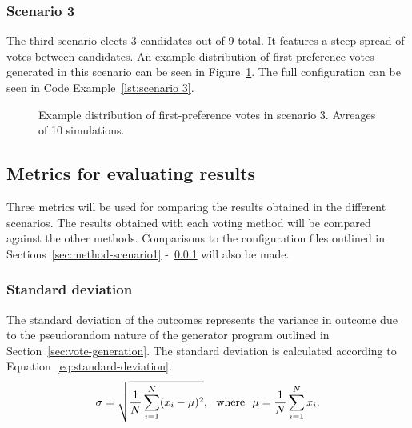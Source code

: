 \documentclass[12pt]{article}
\begin{document}
\subsubsection{Scenario 3}
\label{sec:method-scenario3}
The third scenario elects 3 candidates out of 9 total. It features a steep spread of votes between candidates. An example distribution of first-preference votes generated in this scenario can be seen in Figure~\ref{fig:example of scenario 3}. The full configuration can be seen in Code Example~\ref{lst:scenario 3}.
\begin{figure}[H]
	\centering
	\caption{Example distribution of first-preference votes in scenario 3. Avreages of 10 simulations.}
\label{fig:example of scenario 3}
\end{figure}
\subsection{Metrics for evaluating results}
Three metrics will be used for comparing the results obtained in the different scenarios. The results obtained with each voting method will be compared against the other methods. Comparisons to the configuration files outlined in Sections~\ref{sec:method-scenario1} -~\ref{sec:method-scenario3} will also be made.
\subsubsection{Standard deviation}
The standard deviation of the outcomes represents the variance in outcome due to the pseudorandom nature of the generator program outlined in Section~\ref{sec:vote-generation}. The standard deviation is calculated according to Equation~\ref{eq:standard-deviation}. 
\begin{equation}
	\label{eq:standard-deviation}
	\sigma ={\sqrt {{\frac {1}{N}}\sum _{i=1}^{N}(x_{i}-\mu )^{2}}},{\rm {\ \ where\ \ }}\mu ={\frac {1}{N}}\sum _{i=1}^{N}x_{i}.
\end{equation}
\end{document}
